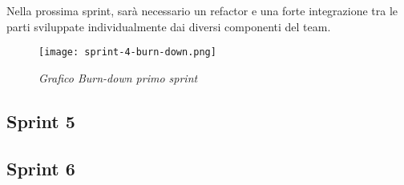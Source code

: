 Nella prossima sprint, sarà necessario un refactor e una forte integrazione tra le parti sviluppate individualmente dai diversi componenti del team.

\begin{figure}[!hbt]
    \centering
    \texttt{[image: sprint-4-burn-down.png]}
    \caption{\textit{Grafico Burn-down primo sprint}} 
\end{figure}

\subsection{Sprint 5}

\subsection{Sprint 6}